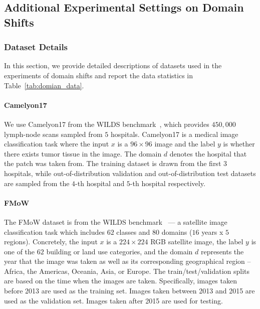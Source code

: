 \subsection{Additional Experimental Settings on Domain Shifts}
\subsubsection{Dataset Details}
\label{sec:app_domain_data}

In this section, we provide detailed descriptions of datasets used in the experiments of domain shifts and report the data statistics in Table~\ref{tab:domian_data}.
\paragraph{Camelyon17}
We use Camelyon17 from the WILDS benchmark~\citep{koh2021wilds,bandi2018detection}, which provides $450,000$ lymph-node scans sampled from $5$ hospitals. 
Camelyon17 is a medical image classification task where the input $x$ is a $96\times 96$ image and the label $y$ is whether there exists tumor tissue in the image. The domain $d$ denotes the hospital that the patch was taken from. The training dataset is drawn from the first $3$ hospitals, while out-of-distribution validation and out-of-distribution test datasets are sampled from the $4$-th hospital and $5$-th hospital respectively. 

\paragraph{FMoW}
The FMoW dataset is from the WILDS benchmark~\citep{koh2021wilds,christie2018functional} --- a satellite image classification task which includes $62$ classes and $80$ domains ($16$ years x $5$ regions). Concretely, the input $x$ is a $224 \times 224$ RGB satellite image, the label $y$ is one of the $62$ building or land use categories, and the domain $d$ represents the year that the image was taken as well as its corresponding geographical region -- Africa, the Americas, Oceania, Asia, or Europe. 
The train/test/validation splits are based on the time when the images are taken. Specifically, images taken before 2013 are used as the training set. Images taken between 2013 and 2015 are used as the validation set. Images taken after 2015 are used for testing. 



